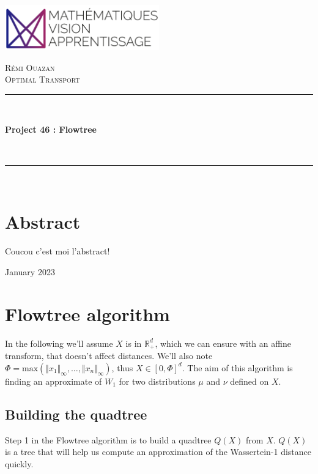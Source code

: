 \documentclass{article}
\begin{document}
\begin{titlepage}
\centering

\includegraphics[width=0.5\textwidth]{imgs/mva.png}
\par\vspace{1cm}

{\scshape\LARGE Rémi Ouazan \\ Optimal Transport \par} 
\vspace{0.5cm}

\rule{\linewidth}{0.2 mm} \\[0.4 cm]
{\huge\bfseries Project 46 : Flowtree \par} \
\rule{\linewidth}{0.2 mm} \\[1.0 cm]

\section*{Abstract}

\justifying
Coucou c'est moi l'abstract!

\vfill

\centering
{\large January 2023\par} %

\end{titlepage}

\newpage
\section{Flowtree algorithm}
In the following we'll assume $X$ is in $\mathbb{R}^d_+$, which we can ensure with an affine transform, that doesn't affect distances.  We'll also note $\Phi = \text{max}(\Vert x_1 \Vert_\infty, \dots, \Vert x_n \Vert_\infty)$, thus $X \in [0, \Phi]^d$. The aim of this algorithm is finding an approximate of $W_1$ for two distributions $\mu$ and $\nu$ defined on $X$.

\subsection{Building the quadtree}\label{ssec:building_the_quandtree}
Step 1 in the Flowtree algorithm is to build a quadtree $Q(X)$ from $X$. $Q(X)$ is a tree that will help us compute an approximation of the Wassertein-1 distance quickly.
\end{document}
